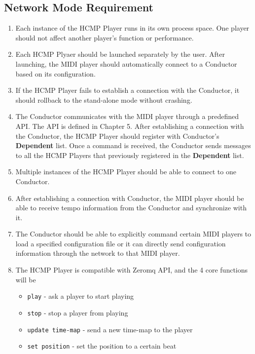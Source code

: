 \subsection{Network Mode Requirement}
\begin{enumerate}
  \item Each instance of the HCMP Player runs in its own process space. One player 
        should not affect another player's function or performance. 
        
  \item Each HCMP Plyaer should be launched separately by the user. After 
        launching, the MIDI player should automatically connect to a Conductor 
        based on its configuration.

  \item If the HCMP Player fails to establish a connection with the Conductor, 
        it should rollback to the stand-alone mode without crashing.

  \item The Conductor communicates with the MIDI player through a predefined API. 
        The API is defined in Chapter 5. After establishing a connection with 
        the Conductor, the HCMP Player should register with Conductor's 
        {\bf Dependent} list. Once a command is received, the Conductor sends 
        messages to all the HCMP Players that previously registered in the 
        {\bf Dependent} list. 

  \item Multiple instances of the HCMP Player should be able to connect to one Conductor. 
  \item After establishing a connection with Conductor, the MIDI player 
        should be able to receive tempo information from the Conductor and 
        synchronize with it.     
  \item The Conductor should be able to explicitly command certain MIDI players to 
        load a specified configuration file or it can directly 
        send configuration information through the network to that MIDI player.
  \item 
    The HCMP Player is compatible with Zeromq \cite{zeromq} API, 
    and the 4 core functions will be
    \begin{itemize}
      \item \texttt{play} - ask a player to start playing 
      \item \texttt{stop} - stop a player from playing 
      \item \texttt{update time-map} - send a new time-map to the player 
      \item \texttt{set position} - set the position to a certain beat 
    \end{itemize}
\end{enumerate}

